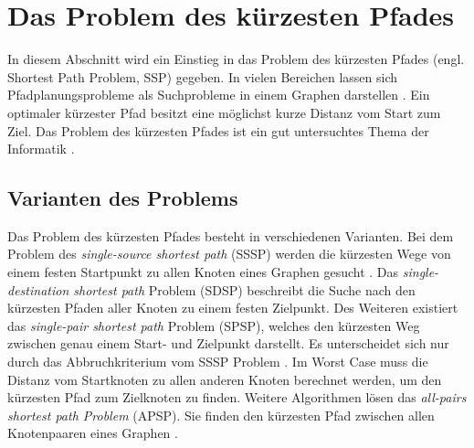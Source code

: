 \chapter{Das Problem des kürzesten Pfades}

In diesem Abschnitt wird ein Einstieg in das Problem des kürzesten Pfades (engl. Shortest Path Problem, SSP) gegeben. In vielen Bereichen lassen sich Pfadplanungsprobleme als Suchprobleme in einem Graphen darstellen \cite{HartNilssonandRaphael.1968}. Ein optimaler kürzester Pfad besitzt eine möglichst kurze Distanz vom Start zum Ziel. Das Problem des kürzesten Pfades ist ein gut untersuchtes Thema der Informatik \cite[S.1]{Madkour.2017}.


\section{Varianten des Problems}

Das Problem des kürzesten Pfades besteht in verschiedenen Varianten. Bei dem Problem des \textit{single-source shortest path} (SSSP) werden die kürzesten Wege von einem festen Startpunkt zu allen Knoten eines Graphen gesucht \cite[S.644]{Cormen.2009}. Das \textit{single-destination shortest path} Problem (SDSP)  beschreibt die Suche nach den kürzesten Pfaden aller Knoten zu einem festen Zielpunkt. Des Weiteren existiert das \textit{single-pair shortest path} Problem (SPSP), welches den kürzesten Weg zwischen genau einem Start- und Zielpunkt darstellt. Es unterscheidet sich nur durch das Abbruchkriterium vom SSSP Problem \cite{Ottmann.2017}. Im Worst Case muss die Distanz vom Startknoten zu allen anderen Knoten berechnet werden, um den kürzesten Pfad zum Zielknoten zu finden. Weitere Algorithmen lösen das \textit{all-pairs shortest path Problem} (APSP). Sie finden den kürzesten Pfad zwischen allen Knotenpaaren eines Graphen \cite[S.644]{Cormen.2009}.


